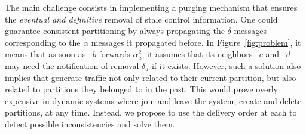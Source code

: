 The main challenge consists in implementing a purging mechanism that
ensures the \emph{eventual and definitive} removal of stale control
information. One could guarantee consistent partitioning by always
propagating the $\delta$ messages corresponding to the $\alpha$
messages it propagated before. In Figure~\ref{fig:problem}, it means
that as soon as \Process~$b$ forwards $\alpha_a^2$, it assumes that
its neighbors \Process~$c$ and \Process~$d$ may need the notification
of removal $\delta_a$ if it exists. However, such a solution also
implies that \processes generate traffic not only related to their
current partition, but also related to partitions they belonged to in
the past. This would prove overly expensive in dynamic systems where
\processes join and leave the system, create and delete partitions, at
any time.  Instead, we propose to use the delivery order at each
\process to detect possible inconsistencies and solve them.




